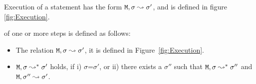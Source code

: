 Execution of a statement has the form ${\mbox{\tt{\ensuremath{{\mbox{\tt{M}}}}}}}, \sigma \leadsto \sigma'$, and is defined in figure \ref{fig:Execution}.

\begin{definition}[Execution] of one or more steps is defined as follows:

\begin{itemize}
     \item
   The relation ${\mbox{\tt{\ensuremath{{\mbox{\tt{M}}}}}}}, \sigma \leadsto \sigma'$, it is defined in Figure~\ref{fig:Execution}.

   \item
   ${\mbox{\tt{\ensuremath{{\mbox{\tt{M}}}}}}}, \sigma \leadsto^* \sigma'$ holds, if i) $\sigma$=$\sigma'$, or ii) there exists a $\sigma''$ such that
   ${\mbox{\tt{\ensuremath{{\mbox{\tt{M}}}}}}}, \sigma \leadsto^* \sigma''$ and ${\mbox{\tt{\ensuremath{{\mbox{\tt{M}}}}}}}, \sigma'' \leadsto \sigma'$.
 \end{itemize}

\end{definition}
 
